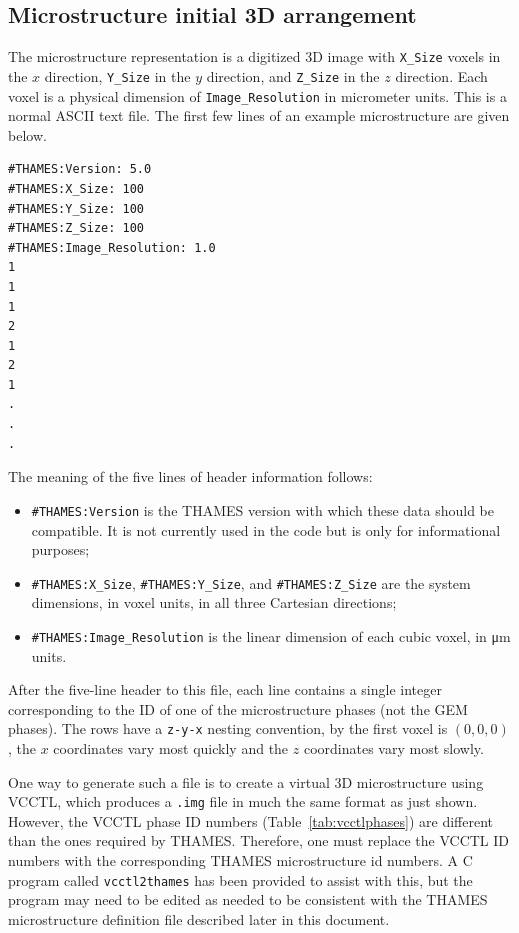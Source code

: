 \documentclass{article}
\begin{document}
\subsection{Microstructure initial 3D arrangement}
The microstructure representation is a digitized 3D image with \verb!X_Size! voxels
in the $x$ direction, \verb!Y_Size! in the $y$ direction, and \verb!Z_Size!
in the $z$ direction.  Each voxel is a physical dimension of
\verb!Image_Resolution! in micrometer units.
This is a normal ASCII text file.  The first few lines of an example microstructure
are given below.

\scriptsize{
	\begin{lstlisting}
#THAMES:Version: 5.0
#THAMES:X_Size: 100
#THAMES:Y_Size: 100
#THAMES:Z_Size: 100
#THAMES:Image_Resolution: 1.0
1
1
1
2
1
2
1
.
.
.
\end{lstlisting}
}

\normalsize{ }
The meaning of the five lines of header information follows:
\begin{itemize}
	\item \verb!#THAMES:Version! is the THAMES version with which these data
	      should be compatible. It is not currently used in the code but is only for
	      informational purposes;
	\item \verb!#THAMES:X_Size!, \verb!#THAMES:Y_Size!, and \verb!#THAMES:Z_Size!
	      are the system dimensions, in voxel units, in all three Cartesian
	      directions;
	\item \verb!#THAMES:Image_Resolution! is the linear dimension of each cubic
	      voxel, in \unit{\micro\meter} units.
\end{itemize}

After the five-line header to this file, each line contains a single integer corresponding to the ID of
one of the microstructure phases (not the GEM phases).  The rows have a
\verb!z-y-x! nesting convention, by the first voxel is $(0,0,0)$, the $x$ coordinates
vary most quickly and the $z$ coordinates vary most slowly.

One way to generate such a file is to create a virtual 3D microstructure using VCCTL,
which produces a \verb!.img! file in much the same format as just shown.  However,
the VCCTL phase ID numbers (Table~\ref{tab:vcctlphases}) are different than the
ones required by THAMES.  Therefore, one must replace
the VCCTL ID numbers with the corresponding THAMES microstructure id numbers.
A C program called \verb!vcctl2thames! has been provided to assist with this, but the
program may need to be edited as needed to be consistent with the THAMES microstructure
definition file described later in this document.
\end{document}
